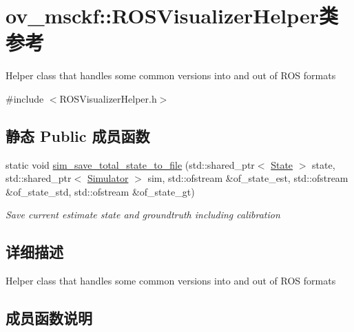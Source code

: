 \hypertarget{classov__msckf_1_1ROSVisualizerHelper}{}\section{ov\+\_\+msckf\+:\+:R\+O\+S\+Visualizer\+Helper类 参考}
\label{classov__msckf_1_1ROSVisualizerHelper}


Helper class that handles some common versions into and out of R\+OS formats  




{\ttfamily \#include $<$R\+O\+S\+Visualizer\+Helper.\+h$>$}

\subsection*{静态 Public 成员函数}
\begin{DoxyCompactItemize}
\item 
static void \hyperlink{classov__msckf_1_1ROSVisualizerHelper_a1fc6dc217407639bac014a51ca944caf}{sim\+\_\+save\+\_\+total\+\_\+state\+\_\+to\+\_\+file} (std\+::shared\+\_\+ptr$<$ \hyperlink{classov__msckf_1_1State}{State} $>$ state, std\+::shared\+\_\+ptr$<$ \hyperlink{classov__msckf_1_1Simulator}{Simulator} $>$ sim, std\+::ofstream \&of\+\_\+state\+\_\+est, std\+::ofstream \&of\+\_\+state\+\_\+std, std\+::ofstream \&of\+\_\+state\+\_\+gt)
\begin{DoxyCompactList}\small\item\em Save current estimate state and groundtruth including calibration \end{DoxyCompactList}\end{DoxyCompactItemize}


\subsection{详细描述}
Helper class that handles some common versions into and out of R\+OS formats 

\subsection{成员函数说明}
\mbox{\label{classov__msckf_1_1ROSVisualizerHelper_a1fc6dc217407639bac014a51ca944caf}} 
